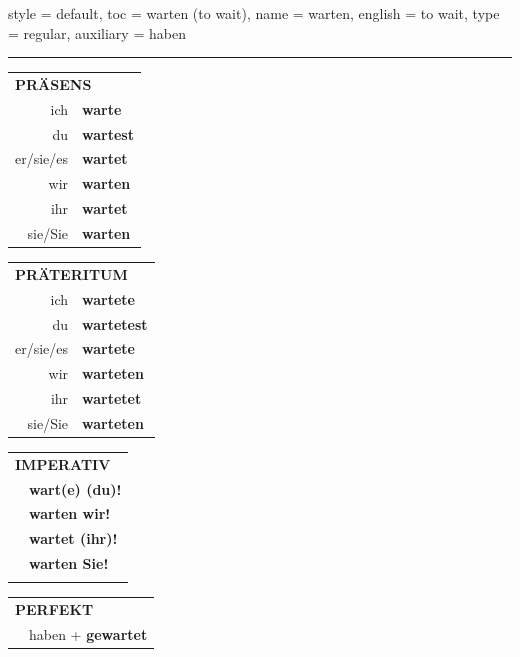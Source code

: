 \begin{verbentry}{
  style = {default},
  toc = {warten (to wait)},
  name = {warten},
  english = {to wait},
  type = {regular},
  auxiliary = {haben}
}
 
    
     \vspace{5pt}

    \hrule
    
    \vspace{5pt}

  \begin{tabular}{rl}
     \multicolumn{2}{l}{\textbf{PRÄSENS} }\\
    ich & \textbf{warte}\\
    du & \textbf{wartest}\\
    er/sie/es & \textbf{wartet}\\
    wir & \textbf{warten}\\
    ihr & \textbf{wartet}\\
    sie/Sie & \textbf{warten}\\
  \end{tabular}
  \hfill
     \begin{tabular}{rl}
    \multicolumn{2}{l}{\textbf{PRÄTERITUM} }\\
    ich & \textbf{wartete}\\
    du & \textbf{wartetest}\\
    er/sie/es & \textbf{wartete}\\
    wir & \textbf{warteten}\\
    ihr & \textbf{wartetet}\\
    sie/Sie & \textbf{warteten}\\
  \end{tabular}
  \hfill
  \begin{tabular}{rl}
     \multicolumn{2}{l}{\textbf{IMPERATIV} }\\
   & \textbf{wart(e) (du)!}\\
   & \textbf{warten wir!}\\
   & \textbf{wartet (ihr)!}\\
   & \textbf{warten Sie!}\\
   & \vspace{10pt}
  \end{tabular}

    \vspace{10pt}

 \begin{tabular}{rl}
     \multicolumn{2}{l}{\textbf{PERFEKT}}\\
  &  haben + \textbf{gewartet}\\
  \end{tabular}
\hfill
   \begin{tabular}{rl}
   

\end{tabular}
\end{verbentry}
